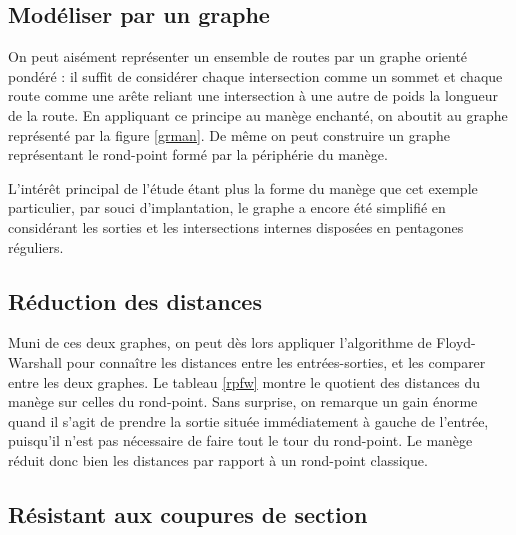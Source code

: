 \documentclass[11pt]{article}
\begin{document}
	\subsection{Modéliser par un graphe}

On peut aisément représenter un ensemble de routes par un graphe orienté pondéré : il suffit de considérer chaque intersection comme un sommet et chaque route comme une arête reliant une intersection à une autre de poids la longueur de la route. En appliquant ce principe au manège enchanté, on aboutit au graphe représenté par la figure \ref{grman}. De même on peut construire un graphe représentant le rond-point formé par la périphérie du manège. \par
L'intérêt principal de l'étude étant plus la forme du manège que cet exemple particulier, par souci d'implantation, le graphe a encore été simplifié en considérant les sorties et les intersections internes disposées en pentagones réguliers.

	
	\subsection{Réduction des distances}
Muni de ces deux graphes, on peut dès lors appliquer l'algorithme de Floyd-Warshall pour connaître les distances entre les entrées-sorties, et les comparer entre les deux graphes. Le tableau \ref{rpfw} montre le quotient des distances du manège sur celles du rond-point. Sans surprise, on remarque un gain énorme quand il s'agit de prendre la sortie située immédiatement à gauche de l'entrée, puisqu'il n'est pas nécessaire de faire tout le tour du rond-point. Le manège réduit donc bien les distances par rapport à un rond-point classique.

	\subsection{Résistant aux coupures de section}
\end{document}
